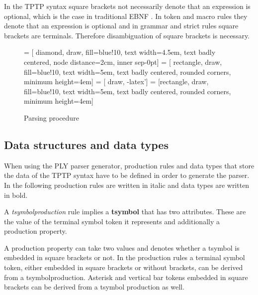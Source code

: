 In the \ac{TPTP} syntax square brackets not necessarily denote that an expression is optional, which is the case in traditional \ac{EBNF} .
In token and macro rules they denote that an expression is optional and in grammar and strict rules square brackets are terminals.
Therefore disambiguation of square brackets is necessary.
\begin{figure}[H]
 = [ diamond, draw, fill=blue!10, text width=4.5em, text badly centered, node distance=2cm, inner sep-0pt]  
 = [ rectangle, draw, fill=blue!10, text width=5em, text badly centered, rounded corners, minimum height=4em]  
 = [ draw, -latex']  
 = [rectangle, draw, fill=blue!10, text width=5em, text badly centered, rounded corners, minimum height=4em]  
\begin{center}
\end{center}
\caption{Parsing procedure}
\label{fig:ConceptParserFlow}
\end{figure}

\subsection{Data structures and data types}\label{sec:ConceptParserDataStructure}

When using the \ac{PLY} parser generator, production rules and data types that store the data of the \ac{TPTP} syntax have to be defined in order to generate the parser. In the following production rules are written in italic and data types are written in bold.

A \textit{t\textunderscore symbol\textunderscore  production} rule implies a \textbf{t\textunderscore symbol} that has two attributes. These are the value of the terminal symbol token it represents and additionally a production property.

A production property can take two values and denotes whether a t\textunderscore  symbol is embedded in square brackets or not. In the production rules a terminal symbol token, either embedded in square brackets or without brackets, can be derived from a t\textunderscore  symbol\textunderscore  production. Asterisk and vertical bar tokens embedded in square brackets can be derived from a t\textunderscore  symbol production as well. 

